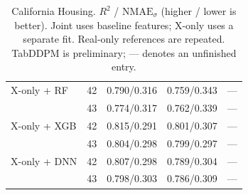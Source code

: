 \begin{table}[ht]
{\begin{tabular}{lrrrr}
X-only + RF & 42 & 0.790/0.316 & 0.759/0.343 & --- \\
 & 43 & 0.774/0.317 & 0.762/0.339 & --- \\
X-only + XGB & 42 & 0.815/0.291 & 0.801/0.307 & --- \\
 & 43 & 0.804/0.298 & 0.799/0.297 & --- \\
X-only + DNN & 42 & 0.807/0.298 & 0.789/0.304 & --- \\
 & 43 & 0.798/0.303 & 0.786/0.309 & --- \\
\bottomrule
\end{tabular}
}
\caption{California Housing. $R^2$ / $\mathrm{NMAE}_{\sigma}$ (higher / lower is better). Joint uses baseline features; X-only uses a separate fit. Real-only references are repeated. TabDDPM is preliminary; --- denotes an unfinished entry.}
\label{tab:california-housing}
\end{table}
